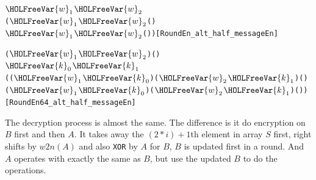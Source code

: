 \documentclass{article}
\begin{document}
\begin{alltt}
\HOLTokenTurnstile{}   \ensuremath{\HOLFreeVar{w}\sb{\mathrm{1}}} \ensuremath{\HOLFreeVar{w}\sb{\mathrm{2}}}  \HOLSymConst{=}
   ( \ensuremath{\HOLFreeVar{w}\sb{\mathrm{1}}} \ensuremath{\HOLFreeVar{w}\sb{\mathrm{2}}}  ( \HOLSymConst{\HOLTokenProd{}} )\HOLSymConst{,}
     \ensuremath{\HOLFreeVar{w}\sb{\mathrm{1}}} \ensuremath{\HOLFreeVar{w}\sb{\mathrm{2}}}  ( \HOLSymConst{\HOLTokenProd{}}  \HOLSymConst{\ensuremath{+}} ))\hfill{[RoundEn_alt_half_messageEn]}
\end{alltt}

\begin{alltt}
\HOLTokenTurnstile{} (\ensuremath{\HOLFreeVar{w}\sb{\mathrm{1}}}\HOLSymConst{,}\ensuremath{\HOLFreeVar{w}\sb{\mathrm{2}}}) \HOLSymConst{=}   \HOLSymConst{\HOLTokenConj{}} (\HOLSymConst{,}\HOLSymConst{,}\HOLSymConst{,}\HOLSymConst{,}\HOLSymConst{,}) \HOLSymConst{=}    \HOLSymConst{\HOLTokenConj{}}
   \ensuremath{\HOLFreeVar{k}\sb{\mathrm{0}}} \HOLSymConst{=}    \HOLSymConst{\HOLTokenConj{}} \ensuremath{\HOLFreeVar{k}\sb{\mathrm{1}}} \HOLSymConst{=}    \HOLSymConst{\HOLTokenImp{}}
       \HOLSymConst{=}
     ( (\ensuremath{\HOLFreeVar{w}\sb{\mathrm{1}}} \HOLSymConst{\ensuremath{+}} \ensuremath{\HOLFreeVar{k}\sb{\mathrm{0}}}) (\ensuremath{\HOLFreeVar{w}\sb{\mathrm{2}}} \HOLSymConst{\ensuremath{+}} \ensuremath{\HOLFreeVar{k}\sb{\mathrm{1}}})  ( \HOLSymConst{\HOLTokenProd{}} )\HOLSymConst{,}
       (\ensuremath{\HOLFreeVar{w}\sb{\mathrm{1}}} \HOLSymConst{\ensuremath{+}} \ensuremath{\HOLFreeVar{k}\sb{\mathrm{0}}}) (\ensuremath{\HOLFreeVar{w}\sb{\mathrm{2}}} \HOLSymConst{\ensuremath{+}} \ensuremath{\HOLFreeVar{k}\sb{\mathrm{1}}})  ( \HOLSymConst{\HOLTokenProd{}}  \HOLSymConst{\ensuremath{+}} ))\hfill{[RoundEn64_alt_half_messageEn]}
\end{alltt}

The decryption process is almost the same. The difference is it do encryption on $B$ first and then $A$. It takes away
the $(2*i)+1$th element in array $S$ first, right shifts by $w2n(A)$ and also \verb|XOR| by $A$ for $B$, $B$ is updated first in
a round. And $A$ operates with exactly the same as $B$, but use the updated $B$ to do the operations.
\end{document}

